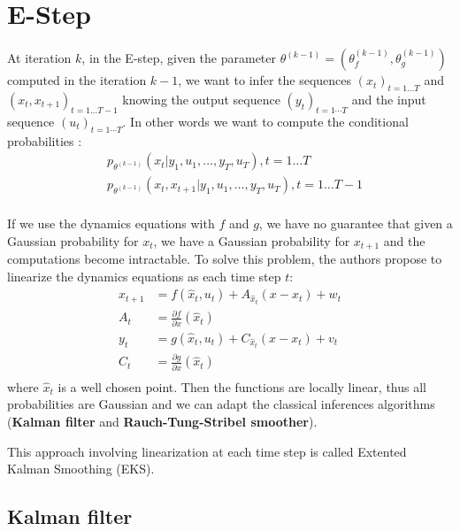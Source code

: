 \section{E-Step}

At iteration $k$, in the E-step, given the parameter $\theta^{(k-1)} = (\theta_f^{(k-1)}, \theta_g^{(k-1)})$ computed in the iteration $k-1$, we want to infer the sequences $(x_t)_{t=1 \ldots T}$ and $(x_t, x_{t+1})_{t=1 \ldots T-1}$ knowing the output sequence $(y_t)_{t=1 \cdots T}$ and the input sequence $(u_t)_{t=1 \cdots T}$.
In other words we want to compute the conditional probabilities :
\begin{align*}
  &p_{\theta^{(k-1)}}\left(x_t|y_1, u_1, \ldots, y_T, u_T \right ), t=1 \ldots T\\
  &p_{\theta^{(k-1)}}\left(x_t, x_{t+1}|y_1, u_1, \ldots, y_T, u_T \right ), t=1 \ldots T-1\\
\end{align*}

If we use the dynamics equations with $f$ and $g$, we have no guarantee that given a Gaussian probability for $x_t$, we have a Gaussian probability for $x_{t+1}$ and the computations become intractable.
To solve this problem, the authors propose to linearize the dynamics equations as each time step $t$:
\begin{align*}
	x_{t+1} &= f(\hat{x}_t, u_t) + A_{\hat{x}_t} (x - x_t) + w_t\\
  A_t &= \frac{\partial f}{\partial x}(\hat{x}_t)\\
	y_t &= g(\hat{x}_t, u_t) + C_{\hat{x}_t} (x - x_t) + v_t\\
  C_t &= \frac{\partial g}{\partial x}(\hat{x}_t)\\
\end{align*}
where $\hat{x}_t$ is a well chosen point.
Then the functions are locally linear, thus all probabilities are Gaussian and we can adapt the classical inferences algorithms (\textbf{Kalman filter} and \textbf{Rauch-Tung-Stribel smoother}).

This approach involving linearization at each time step is called Extented Kalman Smoothing (EKS).

\subsection{Kalman filter}

